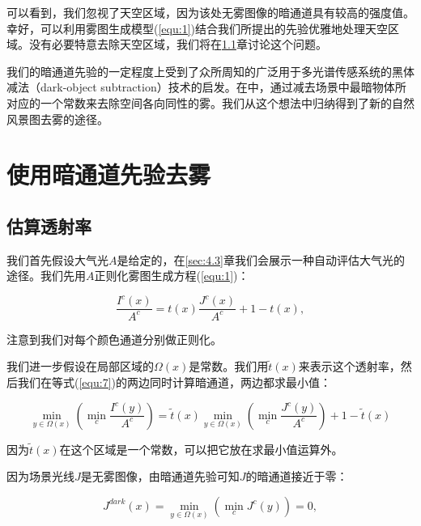 \documentclass{ctexart}
\begin{document}
可以看到，我们忽视了天空区域，因为该处无雾图像的暗通道具有较高的强度值。幸好，可以利用雾图生成模型(\ref{equ:1})结合我们所提出的先验优雅地处理天空区域。没有必要特意去除天空区域，我们将在\ref{sec:4.1}章讨论这个问题。\par

我们的暗通道先验的一定程度上受到了众所周知的广泛用于多光谱传感系统的黑体减法（dark-object subtraction）技术\cite{Chavez1988}的启发。在\cite{Chavez1988}中，通过减去场景中最暗物体所对应的一个常数来去除空间各向同性的雾。我们从这个想法中归纳得到了新的自然风景图去雾的途径。\par



\section{使用暗通道先验去雾}

\subsection{估算透射率}\label{sec:4.1}
我们首先假设大气光$A$是给定的，在\ref{sec:4.3}章我们会展示一种自动评估大气光的途径。我们先用$A$正则化雾图生成方程(\ref{equ:1})：

\begin{equation}\label{equ:7}
	\frac{I^c(x)}{A^c} = t(x)\frac{J^c(x)}{A^c}  + 1 - t(x),
\end{equation}

注意到我们对每个颜色通道分别做正则化。\par

我们进一步假设在局部区域的$\Omega(x)$是常数。我们用$\tilde{t}(x)$来表示这个透射率，然后我们在等式(\ref{equ:7})的两边同时计算暗通道，两边都求最小值：

\begin{equation}\label{equ:8}
	\min_{y \in \Omega(x)} (\min_c \frac{I^c(y)}{A^c}) = \tilde{t}(x) \min_{y \in \Omega(x)} (\min_c \frac{J^c(y)}{A^c}) + 1 - \tilde{t}(x)
\end{equation}

因为$\tilde{t}(x)$在这个区域是一个常数，可以把它放在求最小值运算外。\par

因为场景光线$J$是无雾图像，由暗通道先验可知$J$的暗通道接近于零：

\begin{equation}\label{equ:9}
	J^{dark}(x) = \min_{y \in \Omega(x)} (\min_c J^c(y)) = 0,
\end{equation}
\end{document}
